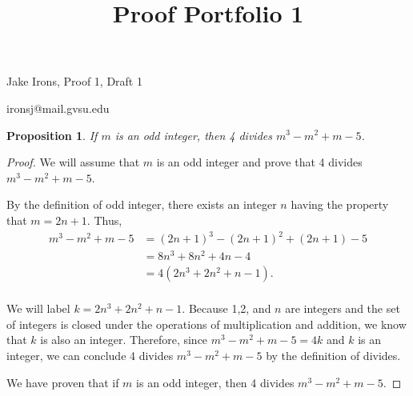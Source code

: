 \documentclass[11 pt]{article}
\title{Proof Portfolio 1}
\newtheorem{proposition}{Proposition}
\newcommand{\newpar}{\vspace{.15in}\noindent}
\begin{document}
\noindent Jake Irons, Proof 1, Draft 1

\noindent ironsj@mail.gvsu.edu

\newpar
\begin{proposition}
If $m$ is an odd integer, then 4 divides $m^3-m^2+m-5$.
\end{proposition}
\begin{proof}
We will assume that $m$ is an odd integer and prove that 4 divides $m^3-m^2+m-5$.

\newpar
By the definition of odd integer, there exists an integer $n$ having the property that $m=2n+1$. Thus,
\begin{align*}
m^3-m^2+m-5&=(2n+1)^3-(2n+1)^2+(2n+1)-5 \\
&=8n^3+8n^2+4n-4 \\
&= 4(2n^3+2n^2+n-1). \\
\end{align*}

\noindent
We will label $k=2n^3+2n^2+n-1$. Because 1,2, and $n$ are integers and the set of integers is closed under the operations of multiplication and addition, we know that $k$ is also an integer. Therefore, since
$m^3-m^2+m-5=4k$ and $k$ is an integer, we can conclude 4 divides $m^3-m^2+m-5$ by the definition of divides. 

\newpar
We have proven that if $m$ is an odd integer, then 4 divides $m^3-m^2+m-5$.
\end{proof}
\end{document}
